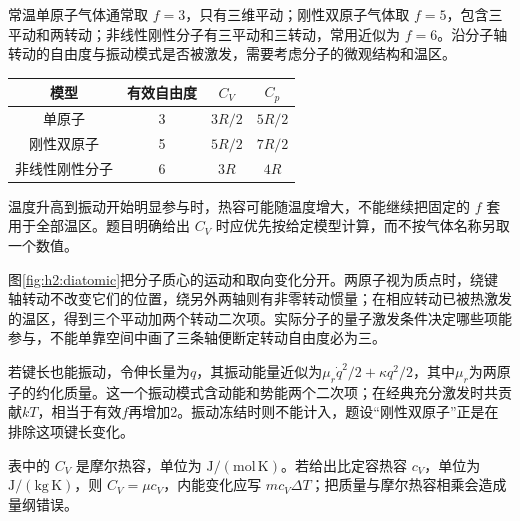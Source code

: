 常温单原子气体通常取 $f=3$，只有三维平动；刚性双原子气体取 $f=5$，包含三平动和两转动；非线性刚性分子有三平动和三转动，常用近似为 $f=6$。沿分子轴转动的自由度与振动模式是否被激发，需要考虑分子的微观结构和温区。

\begin{center}\small\begin{tabular}{cccc}\toprule 模型&有效自由度&$C_V$&$C_p$\\\midrule 单原子&3&$3R/2$&$5R/2$\\刚性双原子&5&$5R/2$&$7R/2$\\非线性刚性分子&6&$3R$&$4R$\\\bottomrule\end{tabular}\end{center}
温度升高到振动开始明显参与时，热容可能随温度增大，不能继续把固定的 $f$ 套用于全部温区。题目明确给出 $C_V$ 时应优先按给定模型计算，而不按气体名称另取一个数值。

图\ref{fig:h2:diatomic}把分子质心的运动和取向变化分开。两原子视为质点时，绕键轴转动不改变它们的位置，绕另外两轴则有非零转动惯量；在相应转动已被热激发的温区，得到三个平动加两个转动二次项。实际分子的量子激发条件决定哪些项能参与，不能单靠空间中画了三条轴便断定转动自由度必为三。


若键长也能振动，令伸长量为$q$，其振动能量近似为$\mu_r\dot q^2/2+\kappa q^2/2$，其中$\mu_r$为两原子的约化质量。这一个振动模式含动能和势能两个二次项；在经典充分激发时共贡献$kT$，相当于有效$f$再增加2。振动冻结时则不能计入，题设“刚性双原子”正是在排除这项键长变化。



表中的 $C_V$ 是摩尔热容，单位为 $\mathrm{J/(mol\,K)}$。若给出比定容热容 $c_V$，单位为 $\mathrm{J/(kg\,K)}$，则 $C_V=\mu c_V$，内能变化应写 $mc_V\Delta T$；把质量与摩尔热容相乘会造成量纲错误。


